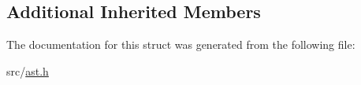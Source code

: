 \subsection*{Additional Inherited Members}


The documentation for this struct was generated from the following file\+:\begin{DoxyCompactItemize}
\item 
src/\hyperlink{ast_8h}{ast.\+h}\end{DoxyCompactItemize}
